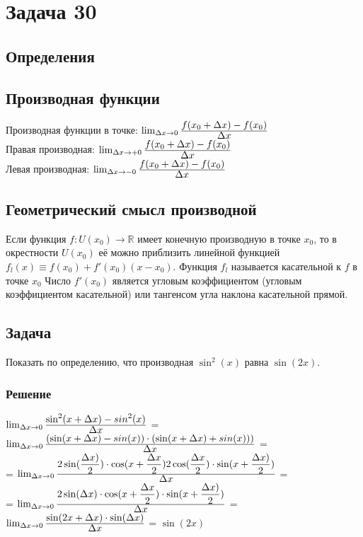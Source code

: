 \section*{Задача 30}
\subsection*{Определения}
\subsection*{Производная функции}
	Производная функции в точке:
	$\lim _{{\Delta x\to 0}}{\frac{\displaystyle f(x_{0}+\Delta x)-f(x_{0})}{\displaystyle \Delta x}}$\\
	Правая производная:
	$\lim _{{\Delta x\to +0}}{\frac{\displaystyle f(x_{0}+\Delta x)-f(x_{0})}{\displaystyle \Delta x}}$\\
	Левая производная:
	$\lim _{{\Delta x\to -0}}{\frac{\displaystyle f(x_{0}+\Delta x)-f(x_{0})}{\displaystyle \Delta x}}$
\subsection*{Геометрический смысл производной}
	Если функция ${f\colon U(x_{0})\to \mathbb {R} }$
	  имеет конечную производную в точке $x_0$, то в окрестности
		 $U(x_{0})$ её можно приблизить линейной функцией
${f_{l}(x)\equiv f(x_{0})+f'(x_{0})(x-x_{0})}$.
Функция ${f_{l}}$ называется касательной к $f$
в точке $x_{0}$ Число ${f'(x_{0})}$
 является угловым коэффициентом (угловым коэффициентом касательной) или тангенсом угла наклона касательной прямой.
 \subsection*{Задача}
 Показать по определению, что производная $\sin^{2}(x)$ равна $\sin(2x)$.
 \subsubsection*{Решение}
 $\lim _{{\Delta x\to 0}}{\frac{\displaystyle \sin^2(x+\Delta x)-sin^2(x)}{\displaystyle \Delta x}}$ =
 $\lim _{{\Delta x\to 0}}{\frac{\displaystyle (\sin(x+\Delta x)-sin(x))\cdot
 (\sin(x+\Delta x)+sin(x)))}{\displaystyle \Delta x}}$ =\\=
 $\lim _{{\Delta x\to 0}}{\frac{\displaystyle 2\sin(\frac{\Delta x)}{2})\cdot\cos(x+\frac{\Delta x}{2})
 2\cos(\frac{\Delta x}{2}) \cdot\sin(x+\frac{\Delta x)}{2})
 }{\displaystyle \Delta x}}$ =\\= $\lim _{{\Delta x\to 0}}{\frac{\displaystyle 2\sin(\Delta x)\cdot\cos(x+\frac{\Delta x}{2})
 \cdot\sin(x+\frac{\Delta x)}{2})
 }{\displaystyle \Delta x}}$ = $\lim _{{\Delta x\to 0}}{\frac{\displaystyle \sin(2x+\Delta x)\cdot\sin(\Delta x)}{\displaystyle \Delta x}}$
 = $\sin(2x)$


